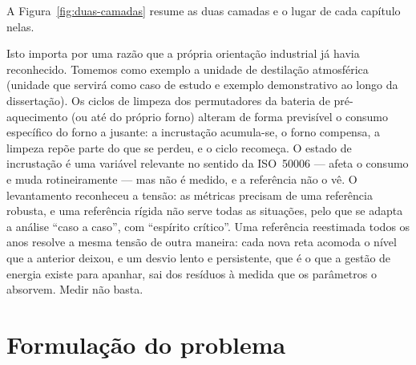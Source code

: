 A Figura~\ref{fig:duas-camadas} resume as duas camadas e o lugar de cada capítulo nelas.



Isto importa por uma razão que a própria orientação industrial
já havia reconhecido. Tomemos como exemplo a unidade de destilação atmosférica (unidade que servirá como caso de estudo e exemplo demonstrativo ao longo da dissertação). Os ciclos de limpeza dos permutadores da bateria de
pré-aquecimento (ou até do próprio forno) alteram de forma previsível o consumo específico do forno
a jusante: a incrustação acumula-se, o forno compensa, a limpeza repõe
parte do que se perdeu, e o ciclo recomeça. O estado de incrustação é uma
variável relevante no sentido da ISO~50006 --- afeta o consumo e muda
rotineiramente --- mas não é medido, e a referência não o vê. O
levantamento reconheceu a tensão: as métricas precisam de uma referência
robusta, e uma referência rígida não serve todas as situações, pelo que
se adapta a análise \enquote{caso a caso}, com \enquote{espírito
crítico}. Uma referência reestimada todos os anos resolve a mesma
tensão de outra maneira: cada nova reta acomoda o nível que a anterior
deixou, e um desvio lento e persistente, que é o que a gestão de energia
existe para apanhar, sai dos resíduos à medida que os parâmetros o
absorvem. Medir não basta.

\section{Formulação do problema}
\label{sec:problema}

